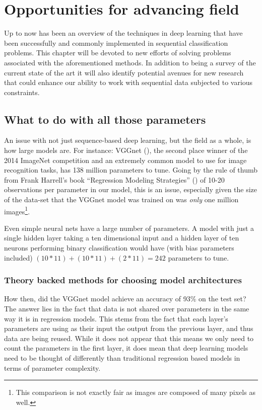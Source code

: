 \documentclass[]{book}
\let\rmarkdownfootnote\footnote%
\def\footnote{\protect\rmarkdownfootnote}
\theoremstyle{definition}
\theoremstyle{definition}
\theoremstyle{definition}
\theoremstyle{remark}
\begin{document}
\chapter{Opportunities for advancing field}\label{future}

Up to now has been an overview of the techniques in deep learning that
have been successfully and commonly implemented in sequential
classification problems. This chapter will be devoted to new efforts of
solving problems associated with the aforementioned methods. In addition
to being a survey of the current state of the art it will also identify
potential avenues for new research that could enhance our ability to
work with sequential data subjected to various constraints.

\section{What to do with all those
parameters}\label{what-to-do-with-all-those-parameters}

An issue with not just sequence-based deep learning, but the field as a
whole, is how large models are. For instance: VGGnet (\citet{vggnet}),
the second place winner of the 2014 ImageNet competition and an
extremely common model to use for image recognition tasks, has 138
million parameters to tune. Going by the rule of thumb from Frank
Harrell's book ``Regression Modeling Strategies'' (\citet{rms}) of 10-20
observations per parameter in our model, this is an issue, especially
given the size of the data-set that the VGGnet model was trained on was
\emph{only} one million images\footnote{This comparison is not exactly
  fair as images are composed of many pixels as well.}.

Even simple neural nets have a large number of parameters. A model with
just a single hidden layer taking a ten dimensional input and a hidden
layer of ten neurons performing binary classification would have (with
bias parameters included) \((10*11) + (10*11) + (2*11) = 242\)
parameters to tune.

\subsection{Theory backed methods for choosing model
architectures}\label{theory-backed-methods-for-choosing-model-architectures}

How then, did the VGGnet model achieve an accuracy of 93\% on the test
set? The answer lies in the fact that data is not shared over parameters
in the same way it is in regression models. This stems from the fact
that each layer's parameters are using as their input the output from
the previous layer, and thus data are being reused. While it does not
appear that this means we only need to count the parameters in the first
layer, it does mean that deep learning models need to be thought of
differently than traditional regression based models in terms of
parameter complexity\citep[\^{}It also points to the advantages of deep
neural nets over wide ones, a topic considered more deeply in][ chapter
13.]{goodfellow_DL}.
\end{document}
